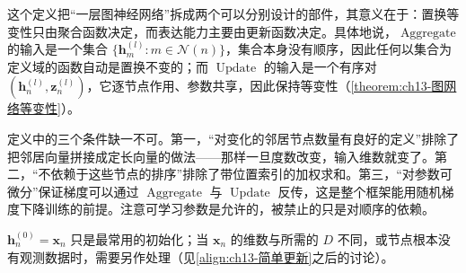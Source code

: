 \documentclass[../../main.tex]{subfiles}
\begin{document}
\begin{remark}
这个定义把“一层图神经网络”拆成两个可以分别设计的部件，其意义在于：置换等变性只由聚合函数决定，而表达能力主要由更新函数决定。具体地说，$\operatorname{Aggregate}$ 的输入是一个集合 $\{\bm{h}_m^{(l)}:m\in\mathcal{N}(n)\}$，集合本身没有顺序，因此任何以集合为定义域的函数自动是置换不变的；而 $\operatorname{Update}$ 的输入是一个有序对 $(\bm{h}_n^{(l)},\bm{z}_n^{(l)})$，它逐节点作用、参数共享，因此保持等变性（\cref{theorem:ch13-图网络等变性}）。\par
定义中的三个条件缺一不可。第一，“对变化的邻居节点数量有良好的定义”排除了把邻居向量拼接成定长向量的做法——那样一旦度数改变，输入维数就变了。第二，“不依赖于这些节点的排序”排除了带位置索引的加权求和。第三，“对参数可微分”保证梯度可以通过 $\operatorname{Aggregate}$ 与 $\operatorname{Update}$ 反传，这是整个框架能用随机梯度下降训练的前提。注意可学习参数是允许的，被禁止的只是对顺序的依赖。\par
$\bm{h}_n^{(0)}=\bm{x}_n$ 只是最常用的初始化；当 $\bm{x}_n$ 的维数与所需的 $D$ 不同，或节点根本没有观测数据时，需要另作处理（见\eqref{align:ch13-简单更新}之后的讨论）。
\end{remark}

\begin{center}
\end{center}
\end{document}
